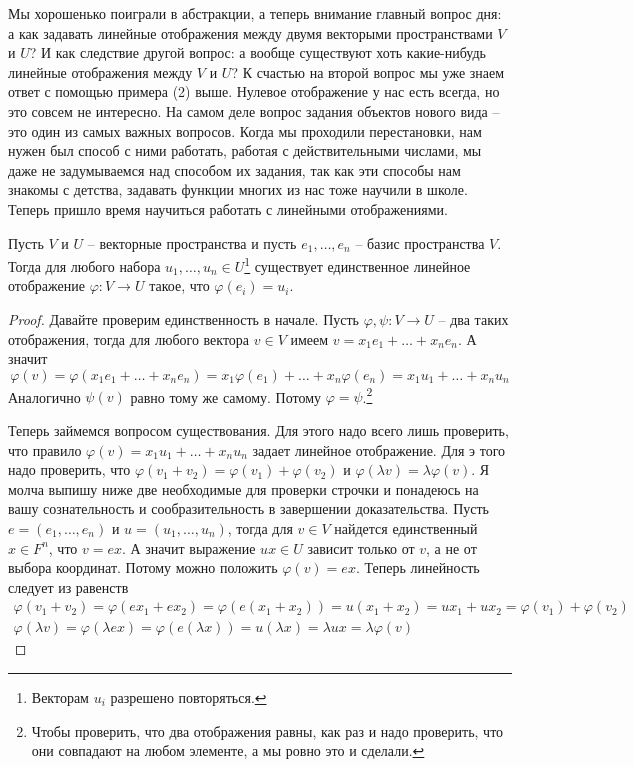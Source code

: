 Мы хорошенько поиграли в абстракции, а теперь внимание главный вопрос дня: а как задавать линейные отображения между двумя векторыми пространствами $V$ и $U$? И как следствие другой вопрос: а вообще существуют хоть какие-нибудь линейные отображения между $V$ и $U$? К счастью на второй вопрос мы уже знаем ответ с помощью примера (2) выше. Нулевое отображение у нас есть всегда, но это совсем не интересно. На самом деле вопрос задания объектов нового вида -- это один из самых важных вопросов. Когда мы проходили перестановки, нам нужен был способ с ними работать, работая с действительными числами, мы даже не задумываемся над способом их задания, так как эти способы нам знакомы с детства, задавать функции многих из нас тоже научили в школе. Теперь пришло время научиться работать с линейными отображениями.

\begin{claim}\label{claim::LinMapExist}
Пусть $V$ и $U$ -- векторные пространства и пусть $e_1,\ldots,e_n$ -- базис пространства $V$. Тогда для любого набора $u_1,\ldots,u_n\in U$\footnote{Векторам $u_i$ разрешено повторяться.} существует единственное линейное отображение $\varphi\colon V\to U$ такое, что $\varphi(e_i) = u_i$.
\end{claim}
\begin{proof}

Давайте проверим единственность в начале. Пусть $\varphi,\psi\colon V\to U$ -- два таких отображения, тогда для любого вектора $v\in V$ имеем $v = x_1 e_1 + \ldots + x_n e_n$. А значит
\[
\varphi(v) = \varphi(x_1 e_1 + \ldots + x_n e_n) = x_1 \varphi(e_1) + \ldots + x_n \varphi(e_n) = x_1 u_1 + \ldots + x_n u_n
\]
Аналогично $\psi(v)$ равно тому же самому. Потому $\varphi = \psi$.\footnote{Чтобы проверить, что два отображения равны, как раз и надо проверить, что они совпадают на любом элементе, а мы ровно это и сделали.}

Теперь займемся вопросом существования. Для этого надо всего лишь проверить, что правило $\varphi(v) =  x_1 u_1 + \ldots + x_n u_n$ задает линейное отображение. Для э того надо проверить, что $\varphi(v_1 + v_2) = \varphi(v_1) + \varphi(v_2)$ и $\varphi(\lambda v) = \lambda \varphi(v)$. Я молча выпишу ниже две необходимые для проверки строчки и понадеюсь на вашу сознательность и сообразительность в завершении доказательства. Пусть $e = (e_1,\ldots,e_n)$ и $u = (u_1,\ldots, u_n)$, тогда для $v\in V$ найдется единственный $x\in F^n$, что $v = ex$. А значит выражение $ux\in U$ зависит только от $v$, а не от выбора координат. Потому можно положить $\varphi(v) = ex$. Теперь линейность следует из равенств
\begin{gather*}
\varphi(v_1 + v_2) = \varphi(ex_1 + ex_2) = \varphi(e(x_1 + x_2)) = u(x_1 + x_2) = u x_1 + ux_2 = \varphi(v_1) + \varphi(v_2)\\
\varphi(\lambda v) = \varphi(\lambda ex) = \varphi(e(\lambda x)) = u (\lambda x) = \lambda u x = \lambda \varphi(v)
\end{gather*}
\end{proof}

